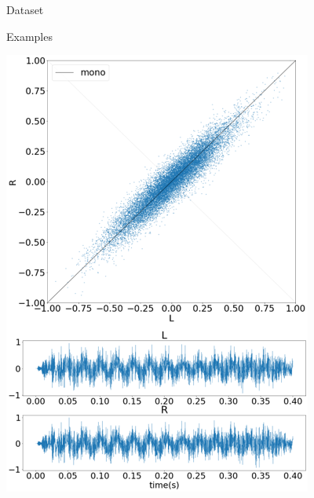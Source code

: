 \begin{frame}{Dataset}
    \begin{block}{Examples}
    \bigskip
    \begin{minipage}{.24\textwidth}
        \centering
        \includegraphics[width=0.9\linewidth]{Presentation/figures/dataset_example_1.png}
    \end{minipage}
    \begin{minipage}{.24\textwidth}
        \centering

\end{minipage}
\end{block}
\end{frame}
